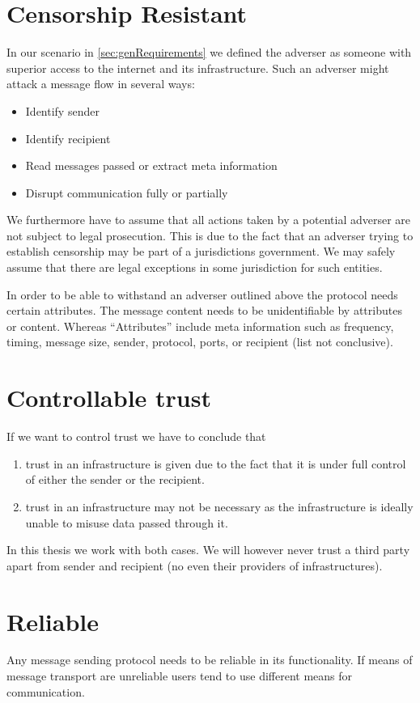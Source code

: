 \section{Censorship Resistant}
In our scenario in \ref{sec:genRequirements} we defined the adverser as someone with superior access to the internet and its infrastructure. Such an adverser might attack a message flow in several ways:
\begin{itemize}
	\item Identify sender
	\item Identify recipient
	\item Read messages passed or extract meta information
	\item Disrupt communication fully or partially
\end{itemize}

We furthermore have to assume that all actions taken by a potential adverser are not subject to legal prosecution. This is due to the fact that an adverser trying to establish censorship may be part of a jurisdictions government. We may safely assume that there are legal exceptions in some jurisdiction for such entities.

In order to be able to withstand an adverser outlined above the protocol needs certain attributes. The message content needs to be unidentifiable by attributes or content. Whereas ``Attributes'' include meta information such as frequency, timing, message size, sender, protocol, ports, or recipient (list not conclusive).

\section{Controllable trust}
If we want to control trust we have to conclude that
\begin{enumerate}
	\item trust in an infrastructure is given due to the fact that it is under full control of either the sender or the recipient.
	\item trust in an infrastructure may not be necessary as the infrastructure is ideally unable to misuse data passed through it.
\end{enumerate}
In this thesis we work with both cases. We will however never trust a third party apart from sender and recipient (no even their providers of infrastructures).

\section{Reliable}
Any message sending protocol needs to be reliable in its functionality. If means of message transport are unreliable users tend to use different means for communication. 

